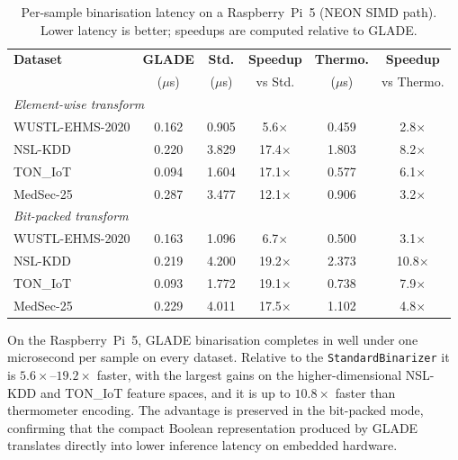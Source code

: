\documentclass[journal,twoside,web]{ieeecolor}
\begin{document}
\begin{table}[t]
\centering
\caption{Per-sample binarisation latency on a Raspberry~Pi~5
(NEON SIMD path). Lower latency is better; speedups are computed
relative to GLADE.}
\label{tab:edge_latency}
\renewcommand{\arraystretch}{1.2}
\small
\begin{tabular}{|l|c|c|c|c|c|}
\hline
\textbf{Dataset} & \textbf{GLADE} & \textbf{Std.} & \textbf{Speedup} & \textbf{Thermo.} & \textbf{Speedup} \\
                 & ($\mu$s)       & ($\mu$s)      & vs Std.          & ($\mu$s)         & vs Thermo. \\
\hline
\multicolumn{6}{|l|}{\textit{Element-wise transform}} \\
\hline
WUSTL-EHMS-2020 & 0.162 & 0.905 & 5.6$\times$  & 0.459 & 2.8$\times$  \\
\hline
NSL-KDD         & 0.220 & 3.829 & 17.4$\times$ & 1.803 & 8.2$\times$  \\
\hline
TON\_IoT        & 0.094 & 1.604 & 17.1$\times$ & 0.577 & 6.1$\times$  \\
\hline
MedSec-25       & 0.287 & 3.477 & 12.1$\times$ & 0.906 & 3.2$\times$  \\
\hline
\multicolumn{6}{|l|}{\textit{Bit-packed transform}} \\
\hline
WUSTL-EHMS-2020 & 0.163 & 1.096 & 6.7$\times$  & 0.500 & 3.1$\times$  \\
\hline
NSL-KDD         & 0.219 & 4.200 & 19.2$\times$ & 2.373 & 10.8$\times$ \\
\hline
TON\_IoT        & 0.093 & 1.772 & 19.1$\times$ & 0.738 & 7.9$\times$  \\
\hline
MedSec-25       & 0.229 & 4.011 & 17.5$\times$ & 1.102 & 4.8$\times$  \\
\hline
\end{tabular}
\end{table}

On the Raspberry~Pi~5, GLADE binarisation completes in well under one
microsecond per sample on every dataset. Relative to the
\texttt{StandardBinarizer} it is $5.6\times$--$19.2\times$ faster, with
the largest gains on the higher-dimensional NSL-KDD and TON\_IoT
feature spaces, and it is up to $10.8\times$ faster than thermometer
encoding. The advantage is preserved in the bit-packed mode, confirming
that the compact Boolean representation produced by GLADE translates
directly into lower inference latency on embedded hardware.


\end{document}
